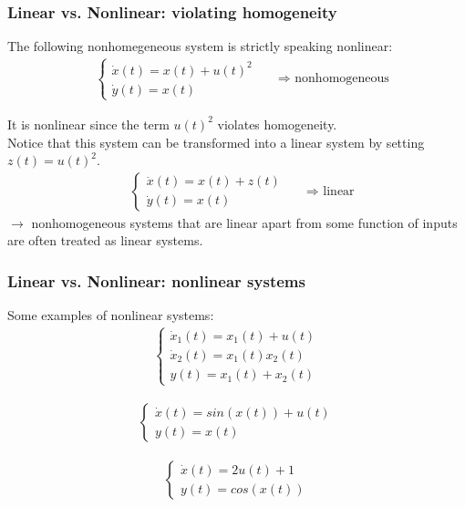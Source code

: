 \begin{frame}
	\frametitle{Linear vs. Nonlinear: violating homogeneity}
	The following nonhomegeneous system is strictly speaking nonlinear:
		\begin{align*}
		& \begin{cases}
			\dot{x}(t) = x(t) + u(t)^{2}\\
			\dot{y}(t) = x(t)
		\end{cases} &&\text{$\Rightarrow$ nonhomogeneous}
	\end{align*}
	
	It is nonlinear since the term $u(t)^{2}$ violates homogeneity.\\
	Notice that this system can be transformed into a linear system by setting $z(t) = u(t)^{2}$.
		\begin{align*}
		& \begin{cases}
			\dot{x}(t) = x(t) + z(t)\\ 
			\dot{y}(t) = x(t)
		\end{cases} &&\text{$\Rightarrow$ linear}
	\end{align*}
	$\rightarrow$ nonhomogeneous systems that are linear apart from some function of inputs are often treated as linear systems.
\end{frame}

\begin{frame}
	\frametitle{Linear vs. Nonlinear: nonlinear systems}
	Some examples of nonlinear systems:
	\begin{align*}
		\begin{cases}
			\dot{x}_{1}(t) = x_{1}(t) + u(t)\\
			\dot{x}_{2}(t) = x_{1}(t) x_{2}(t)\\
			y(t) = x_{1}(t) + x_{2}(t)
		\end{cases}
	\end{align*}
	
	\begin{align*}
		\begin{cases}
			\dot{x}(t) = sin(x(t)) + u(t)\\
			y(t) = x(t)
		\end{cases}
	\end{align*}
	
	\begin{align*}
		\begin{cases}
			\dot{x}(t) = 2 u(t) + 1\\
			y(t) = cos(x(t))
		\end{cases}
	\end{align*}
	
\end{frame}

